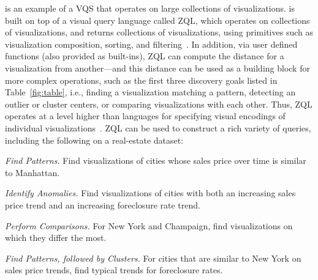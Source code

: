 \zv is an example of a VQS that operates on 
large collections of visualizations.
\zv is built on top of a visual query language
called ZQL, which operates on collections of visualizations, and returns
collections of visualizations,
using primitives such as visualization composition,
sorting, and filtering~\cite{Siddiqui2016}. 
In addition, via user defined functions (also provided as built-ins),
ZQL can compute the distance for a visualization from another---and this
distance can be used as a building block for more complex
operations, such as the first three discovery goals listed
in Table~\ref{fig:table}, i.e., finding a visualization
matching a pattern, detecting an outlier or cluster centers,
or comparing visualizations with each other.
Thus, ZQL operates at a level higher than
languages for specifying visual encodings of
individual visualizations~\cite{Stolte2002,Wilkinson2005}.
ZQL can be used to construct a rich variety of queries,
including the following on a real-estate dataset:
\squishlist
	\item {\em Find Patterns.} Find visualizations of cities whose sales price over time is similar to Manhattan. 
	\item {\em Identify Anomalies.} Find visualizations of cities with both an increasing sales price trend and an increasing foreclosure rate trend.
	\item {\em Perform Comparisons.} For New York and Champaign, find visualizations on which they differ the most.
	\item {\em Find Patterns, followed by Clusters.} For cities that are similar
	to New York on sales price trends, find typical trends for foreclosure rates.
\squishend

